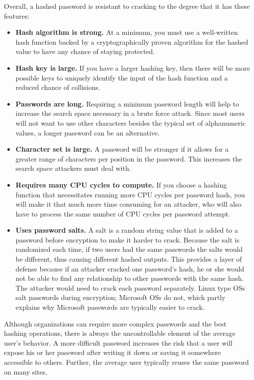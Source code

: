 \noindent
Overall, a hashed password is resistant to cracking to the degree that it has these features:
\begin{itemize}
  \item \textbf{Hash algorithm is strong.}
  At a minimum, you must use a well-written hash function backed by a cryptographically proven algorithm for the hashed value to have any chance of staying protected.

  \item \textbf{Hash key is large.}
  If you have a larger hashing key, then there will be more possible keys to uniquely identify the input of the hash function and a reduced chance of collisions.

  \item \textbf{Passwords are long.}
  Requiring a minimum password length will help to increase the search space necessary in a brute force attack. Since most users will not want to use other characters besides the typical set of alphanumeric values, a longer password can be an alternative.

  \item \textbf{Character set is large.}
  A password will be stronger if it allows for a greater range of characters per position in the password. This increases the search space attackers must deal with.

  \item \textbf{Requires many CPU cycles to compute.}
  If you choose a hashing function that necessitates running more CPU cycles per password hash, you will make it that much more time consuming for an attacker, who will also have to process the same number of CPU cycles per password attempt.

  \item \textbf{Uses password salts.}
  A salt is a random string value that is added to a password before encryption to make it harder to crack. Because the salt is randomized each time, if two users had the same passwords the salts would be different, thus causing different hashed outputs. This provides a layer of defense because if an attacker cracked one password’s hash, he or she would not be able to find any relationship to other passwords with the same hash. The attacker would need to crack each password separately. Linux type OSs salt passwords during encryption; Microsoft OSs do not, which partly explains why Microsoft passwords are typically easier to crack.

\end{itemize}
Although organizations can require more complex passwords and the best hashing operations, there is always the uncontrollable element of the average user’s behavior. A more difficult password increases the risk that a user will expose his or her password after writing it down or saving it somewhere accessible to others. Further, the average user typically reuses the same password on many sites.

